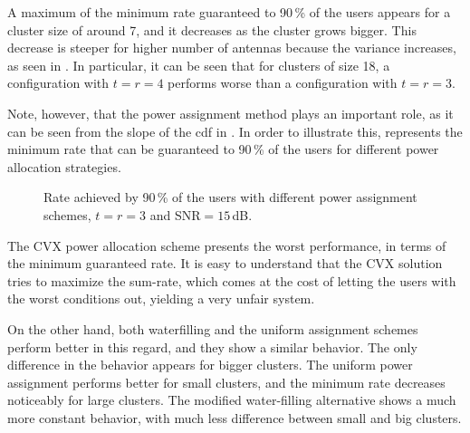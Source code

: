 A maximum of the minimum rate guaranteed to 90\,\% of the users appears for a
cluster size of around 7, and it decreases as the cluster grows bigger. This
decrease is steeper for higher number of antennas because the variance
increases, as seen in . In particular, it can be seen
that for clusters of size 18, a configuration with $t=r=4$ performs worse than a
configuration with $t=r=3$.

Note, however, that the power assignment method plays an important role, as it
can be seen from the slope of the \gls{cdf} in . In
order to illustrate this,  represents the minimum
rate that can be guaranteed to 90\,\% of the users for different power
allocation strategies.

\begin{figure}[t]
\begin{center}
    \dummybox
\end{center}
\caption{Rate achieved by 90\,\% of the users with different power assignment
schemes, $t=r=3$ and SNR$=15$\,dB.}
\label{fig:min_rate_power_alloc}
\end{figure}

The CVX power allocation scheme presents the worst performance, in terms of
the minimum guaranteed rate. It is easy to understand that the CVX solution
tries to maximize the sum-rate, which comes at the cost of letting the users
with the worst conditions out, yielding a very unfair system.

On the other hand, both waterfilling and the uniform assignment schemes perform
better in this regard, and they show a similar behavior. The only difference in
the behavior appears for bigger clusters. The uniform power assignment performs
better for small clusters, and the minimum rate decreases noticeably for large
clusters. The modified water-filling alternative shows a much more constant
behavior, with much less difference between small and big clusters.
